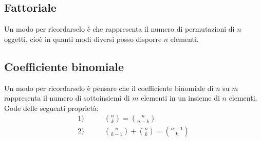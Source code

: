 \subsection{Fattoriale}

Un modo per ricordarselo è che rappresenta il numero di permutazioni di $n$ oggetti, cioè in quanti modi diversi posso disporre $n$ elementi.

\subsection{Coefficiente binomiale} \label{coefficiente-binomiale}


Un modo per ricordarselo è pensare che il coefficiente binomiale di $n$ su $m$ rappresenta il numero di sottoinsiemi di $m$ elementi in un insieme di $n$ elementi.\\
Gode delle seguenti proprietà:
\begin{align*}
    1) &\qquad\binom{n}{k} = \binom{n}{n-k}\\[0.2cm]
    2) &\qquad\binom{n}{k-1} + \binom{n}{k} = \binom{n+1}{k}
\end{align*}

